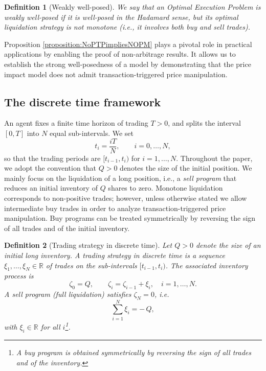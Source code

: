\documentclass[final,3p,authoryear,12pt]{elsarticle}
\newtheorem{definition}{Definition}
\begin{document}
\begin{definition}[Weakly well-posed]
We say that an Optimal Execution Problem is \emph{weakly well-posed} if it is
well-posed in the Hadamard sense, but its optimal liquidation strategy is not
monotone (i.e., it involves both buy and sell trades).
\end{definition}

Proposition \ref{proposition:NoPTPimpliesNOPM} plays a pivotal role in practical applications by enabling the proof of non-arbitrage results. It allows us to establish the strong well-posedness of a model by demonstrating that the price impact model does not admit transaction-triggered price manipulation. 

\subsection{The discrete time framework}\label{secton2:DT}


An agent fixes a finite time horizon of trading $T>0$, and splits the interval
$[0,T]$ into $N$ equal sub-intervals. We set
\[
t_i=\frac{iT}{N},\qquad i=0,\dots,N,
\]
so that the trading periods are $[t_{i-1},t_i)$ for $i=1,\dots,N$. Throughout
the paper, we adopt the convention that \(Q>0\) denotes the size
of the initial position. We mainly focus on the liquidation of a long
position, i.e., a \emph{sell program} that reduces an initial inventory
of \(Q\) shares to zero. Monotone liquidation corresponds to non-positive
trades; however, unless otherwise stated we allow intermediate buy trades in
order to analyze transaction-triggered price manipulation.
Buy programs can be treated symmetrically by reversing the sign of all
trades and of the initial inventory.


\begin{definition}[Trading strategy in discrete time]
\label{definition:strategy}
Let \(Q>0\) denote the size of an initial long inventory.
A trading strategy in discrete time is a sequence
\(\xi_1,\dots,\xi_N \in \mathbb{R}\) of trades on the sub-intervals
\([t_{i-1},t_i)\). The associated inventory process is
\[
\zeta_0 = Q,\qquad \zeta_i = \zeta_{i-1} + \xi_i,\quad i=1,\dots,N.
\]
A \emph{sell program} (full liquidation) satisfies \(\zeta_N=0\), i.e.
\[
\sum_{i=1}^{N} \xi_i = -\,Q,
\]
with \(\xi_i \in \mathbb{R}\) for all \(i\)\footnote{A \emph{buy program} is obtained
symmetrically by reversing the sign of all trades and of the inventory.}.
\end{definition}
\end{document}
